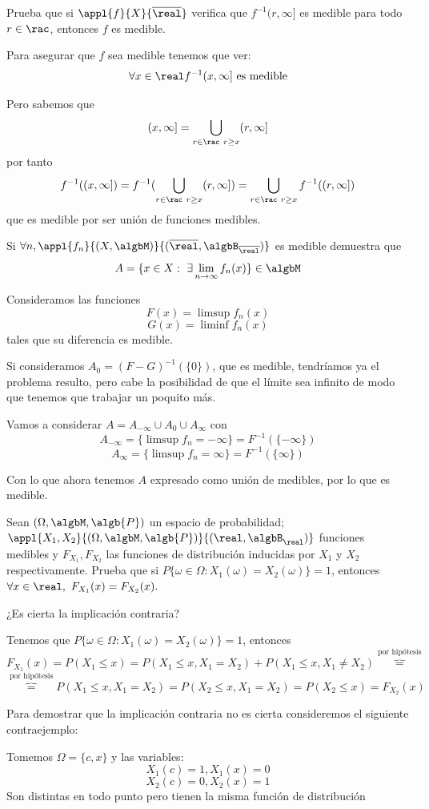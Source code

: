 \begin{problem}[4]
Prueba que si $\appl{f}{X}{\overline{\real}}$ verifica que $f^{-1}(r, \infty]$ es medible para todo $r\in\rac$, entonces $f$ es medible.

\solution
Para asegurar que $f$ sea medible tenemos que ver:
\[\forall x \in \real f^{-1}(x, \infty] \text{ es medible}\]

Pero sabemos que
\[(x, \infty] = \bigcup_{r \in \rac \ r \geq x}(r, \infty]\]
por tanto
\[f^{-1}((x, \infty]) = f^{-1}(\bigcup_{r \in \rac \ r \geq x}(r, \infty]) = \bigcup_{r \in \rac \ r \geq x} f^{-1}((r, \infty])\]
que es medible por ser unión de funciones medibles.

\end{problem}

\begin{problem}[5]
Si $\forall n, \appl{f_n}{(X,\algbM)}{(\overline{\real}, \algbB_{\overline{\real}})}$ es medible demuestra que
\[A = \{x \in X : \ \exists  \lim_{n \to \infty} f_n(x)\} \in \algbM\]
\solution

Consideramos las funciones
\[F(x) = \limsup f_n(x) \]
\[G(x) = \liminf f_n(x) \]
tales que su diferencia es medible.

Si consideramos $A_0=(F-G)^{-1}(\{0\})$, que es medible, tendríamos ya el problema resulto, pero cabe la posibilidad de que el límite sea infinito de modo que tenemos que trabajar un poquito más.

Vamos a considerar $A=A_{-\infty} \cup A_0 \cup A_{\infty}$ con
\[A_{-\infty} = \{\limsup f_n = -\infty\}=F^{-1}(\{-\infty\})\]
\[A_{\infty} = \{\limsup f_n = \infty\}=F^{-1}(\{\infty\})\]

Con lo que ahora tenemos $A$ expresado como unión de medibles, por lo que es medible.

\end{problem}

\begin{problem}[6]
Sean $(\Omega, \algbM, \algb{P})$ un espacio de probabilidad; $\appl{X_1, X_2}{(\Omega, \algbM, \algb{P})}{(\real, \algbB_{\real})}$ funciones medibles y $F_{X_1}, F_{X_2}$ las funciones de distribución inducidas por $X_1$ y $X_2$ respectivamente. Prueba que si $P\{\omega \in \Omega : X_1(\omega)=X_2(\omega)\}=1$, entonces $\forall x \in \real, \ F_{X_1}(x) = F_{X_2}(x).$

¿Es cierta la implicación contraria?

\solution
Tenemos que $P\{\omega \in \Omega : X_1(\omega)=X_2(\omega)\}=1$, entonces
\[F_{X_1}(x) = P(X_1 \leq x) = P(X_1 \leq x, X_1=X_2) + P(X_1 \leq x, X_1 \neq X_2) \overbrace{=}^{\text{por hipótesis}}  \]
\[\overbrace{=}^{\text{por hipótesis}}  P(X_1 \leq x, X_1=X_2) = P(X_2 \leq x, X_1=X_2)=P(X_2  \leq x)=F_{X_2}(x)\]

Para demostrar que la implicación contraria no es cierta consideremos el siguiente contraejemplo:

Tomemos $\Omega = \{c,x\}$ y las variables:
\[X_1(c)=1, X_1(x)=0\]
\[X_2(c)=0, X_2(x)=1\]
Son distintas en todo punto pero tienen la misma función de distribución
\end{problem}

